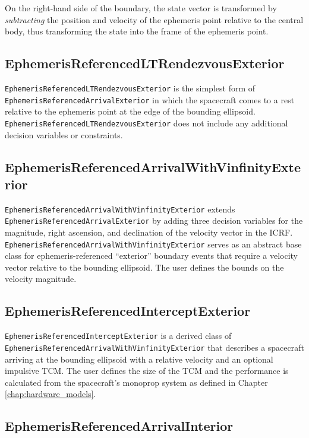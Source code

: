 On the right-hand side of the boundary, the state vector is transformed by \textit{subtracting} the position and velocity of the ephemeris point relative to the central body, thus transforming the state into the frame of the ephemeris point.

\subsection{EphemerisReferencedLTRendezvousExterior}
\label{subsubsec:EphemerisReferencedLTRendezvousExterior}

\texttt{EphemerisReferencedLTRendezvousExterior} is the simplest form of \texttt{EphemerisReferencedArrivalExterior} in which the spacecraft comes to a rest relative to the ephemeris point at the edge of the bounding ellipsoid. \texttt{EphemerisReferencedLTRendezvousExterior} does not include any additional decision variables or constraints.

\subsection{EphemerisReferencedArrivalWithVinfinityExterior}
\label{subsubsec:EphemerisReferencedArrivalWithVinfinityExterior}

\texttt{EphemerisReferencedArrivalWithVinfinityExterior} extends \texttt{EphemerisReferencedArrivalExterior} by adding three decision variables for the magnitude, right ascension, and declination of the velocity vector in the ICRF. \texttt{EphemerisReferencedArrivalWithVinfinityExterior} serves as an abstract base class for ephemeris-referenced ``exterior'' boundary events that require a velocity vector relative to the bounding ellipsoid. The user defines the bounds on the velocity magnitude.

\subsection{EphemerisReferencedInterceptExterior}
\label{subsubsec:EphemerisReferencedInterceptExterior}

\texttt{EphemerisReferencedInterceptExterior} is a derived class of \texttt{EphemerisReferencedArrivalWithVinfinityExterior} that describes a spacecraft arriving at the bounding ellipsoid with a relative velocity and an optional impulsive TCM. The user defines the size of the TCM and the performance is calculated from the spacecraft's monoprop system as defined in Chapter \ref{chap:hardware_models}.

\subsection{EphemerisReferencedArrivalInterior}
\label{subsubsec:EphemerisReferencedArrivalInterior}

